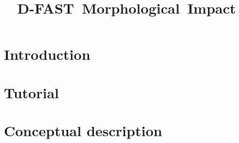 \documentclass{deltares_manual}
\newcommand{\dfastmi}{\textrm{D-FAST~Morphological~Impact}\xspace}
\begin{document}
\pagestyle{empty}
\cleardoublepage
\title{\dfastmi}
\subtitle{}

\author{ }

\deltarestitle
%
\chapter{Introduction}
\chapter{Tutorial}
\chapter{Conceptual description}

%


%

\pagestyle{empty}
\cleardoublepage
\mbox{}
\end{document}
